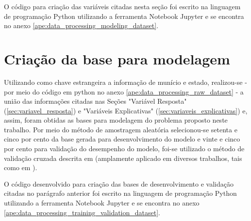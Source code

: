 O código para criação das variáveis citadas nesta seção foi escrito na linguagem de programação Python utilizando a ferramenta Notebook Jupyter e se encontra no anexo \ref{ape:data_processing_modeling_dataset}.

\section{Criação da base para modelagem}
\label{sec:criacao_da_base_para_modelagem}

Utilizando como chave estrangeira a informação de munício e estado, realizou-se - por meio do código em python no anexo \ref{ape:data_processing_raw_dataset} - a união das informações citadas nas Seções "Variável Resposta" (\ref{sec:variavel_resposta}) e "Variáveis Explicativas" (\ref{sec:variaveis_explicativas}) e, assim, foram obtidas as bases para modelagem do problema proposto neste trabalho. Por meio do método de amostragem aleatória selecionou-se setenta e cinco por cento da base gerada para desenvolvimento do modelo e vinte e cinco por cento para validação do desempenho do modelo, foi-se utilizado o método de validação cruzada descrita em \citet{Kohavi1995} (amplamente aplicado em diversos trabalhos, tais como em \citet{Wesllen2017:MSc}).

O código desenvolvido para criação das bases de desenvolvimento e validação citadas no parágrafo anterior foi escrito na linguagem de programação Python utilizando a ferramenta Notebook Jupyter e se encontra no anexo \ref{ape:data_processing_training_validation_dataset}.

